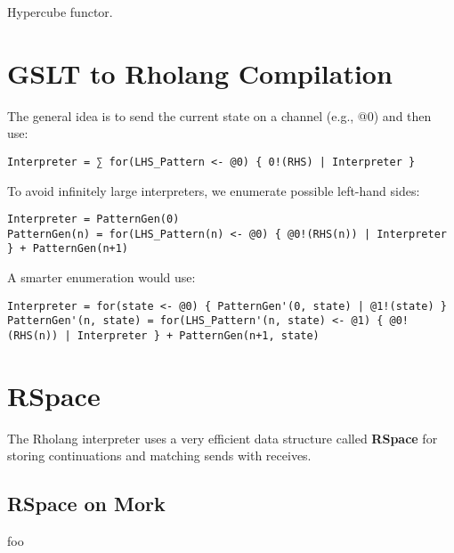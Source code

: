 \documentclass{article}
\begin{document}
Hypercube functor.

\section{GSLT to Rholang Compilation}

The general idea is to send the current state on a channel (e.g., @0) and then use:

\begin{verbatim}
Interpreter = ∑ for(LHS_Pattern <- @0) { 0!(RHS) | Interpreter }
\end{verbatim}

To avoid infinitely large interpreters, we enumerate possible left-hand sides:

\begin{verbatim}
Interpreter = PatternGen(0)
PatternGen(n) = for(LHS_Pattern(n) <- @0) { @0!(RHS(n)) | Interpreter } + PatternGen(n+1)
\end{verbatim}

A smarter enumeration would use:

\begin{verbatim}
Interpreter = for(state <- @0) { PatternGen'(0, state) | @1!(state) }
PatternGen'(n, state) = for(LHS_Pattern'(n, state) <- @1) { @0!(RHS(n)) | Interpreter } + PatternGen(n+1, state)
\end{verbatim}

\section{RSpace}

The Rholang interpreter uses a very efficient data structure called \textbf{RSpace} for storing continuations and matching sends with receives.

\subsection{RSpace on Mork}

foo
\end{document}
